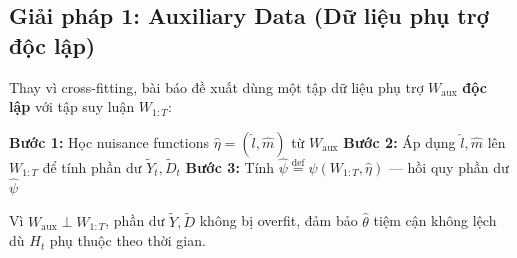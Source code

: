 \subsection{Giải pháp 1: Auxiliary Data (Dữ liệu phụ trợ độc lập)}

Thay vì cross-fitting, bài báo đề xuất dùng một tập dữ liệu phụ trợ \(W_{\text{aux}}\) \textbf{độc lập} với tập suy luận \(W_{1:T}\):

\begin{algorithm}[H]
\caption{Double Machine Learning for Shared-State Interference (DML4SSI)}
\begin{algorithmic}[1]
    \State \textbf{Bước 1:} Học nuisance functions \(\hat{\eta} = (\hat{l}, \hat{m})\) từ \(W_{\text{aux}}\)
    \State \textbf{Bước 2:} Áp dụng \(\hat{l}, \hat{m}\) lên \(W_{1:T}\) để tính phần dư \(\tilde{Y}_t, \tilde{D}_t\)
    \State \textbf{Bước 3:} Tính \(\hat{\psi} \stackrel{\text{def}}{=} \psi(W_{1:T}, \hat{\eta})\) --- hồi quy phần dư
    \State \Return \(\hat{\psi}\)
\end{algorithmic}
\end{algorithm}

Vì \(W_{\text{aux}} \perp W_{1:T}\), phần dư \(\tilde{Y}, \tilde{D}\) không bị overfit, đảm bảo \(\hat{\theta}\) tiệm cận không lệch dù \(H_t\) phụ thuộc theo thời gian.

